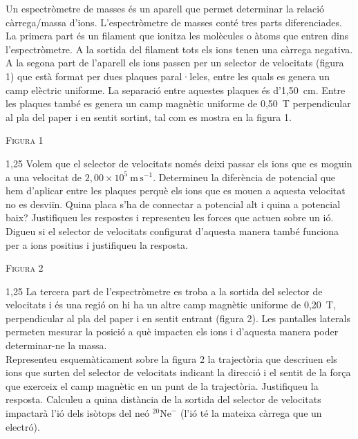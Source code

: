 Un espectròmetre de masses és un aparell que permet determinar la relació càrrega/massa d'ions. L'espectròmetre de masses conté tres parts diferenciades. La primera part és un filament que ionitza les molècules o àtoms que entren dins l'espectròmetre. A la sortida del filament tots els ions tenen una càrrega negativa. A la segona part de l'aparell els ions passen per un selector de velocitats (figura 1) que està format per dues plaques paral·leles, entre les quals es genera un camp elèctric uniforme. La separació entre aquestes plaques és d'1,50~cm. Entre les plaques també es genera un camp magnètic uniforme de 0,50~T perpendicular al pla del paper i en sentit sortint, tal com es mostra en la figura 1.

\begin{center}
\textsc{Figura 1}
\end{center}

\begin{apartat}{1,25}
Volem que el selector de velocitats només deixi passar els ions que es moguin a una velocitat de $2,00\times 10^{5}\ \mathrm{m\,s^{-1}}$. Determineu la diferència de potencial que hem d'aplicar entre les plaques perquè els ions que es mouen a aquesta velocitat no es desviïn. Quina placa s'ha de connectar a potencial alt i quina a potencial baix? Justifiqueu les respostes i representeu les forces que actuen sobre un ió. Digueu si el selector de velocitats configurat d'aquesta manera també funciona per a ions positius i justifiqueu la resposta.
\end{apartat}

\begin{center}
\textsc{Figura 2}
\end{center}

\begin{apartat}{1,25}
La tercera part de l'espectròmetre es troba a la sortida del selector de velocitats i és una regió on hi ha un altre camp magnètic uniforme de 0,20~T, perpendicular al pla del paper i en sentit entrant (figura 2). Les pantalles laterals permeten mesurar la posició a què impacten els ions i d'aquesta manera poder determinar-ne la massa.\\
\hspace*{1.5em}Representeu esquemàticament sobre la figura 2 la trajectòria que descriuen els ions que surten del selector de velocitats indicant la direcció i el sentit de la força que exerceix el camp magnètic en un punt de la trajectòria. Justifiqueu la resposta. Calculeu a quina distància de la sortida del selector de velocitats impactarà l'ió dels isòtops del neó $^{20}\mathrm{Ne}^{-}$ (l'ió té la mateixa càrrega que un electró).
\end{apartat}

